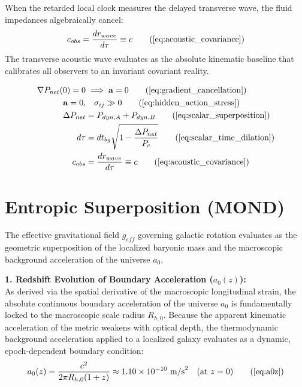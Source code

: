 \documentclass[11pt, a4paper]{article}
\begin{document}
When the retarded local clock measures the delayed transverse wave, the fluid impedances algebraically cancel:
\begin{equation}
    c_{obs} = \frac{dr_{wave}}{d\tau} \equiv c \tag{\ref{eq:acoustic_covariance}}
\end{equation}
The transverse acoustic wave evaluates as the absolute kinematic baseline that calibrates all observers to an invariant covariant reality.

\begin{tcolorbox}[recallbox, title={\ref{box:auxetic_symmetry_covariance}. Symmetry Breaking \& Covariance}]
\begin{align}
    \nabla P_{net}(0) = 0 &\implies \mathbf{a} = 0 \tag{\ref{eq:gradient_cancellation}} \\
    \mathbf{a} = 0, &\quad \sigma_{ij} \gg 0 \tag{\ref{eq:hidden_action_stress}} \\
    \Delta P_{net} &= P_{dyn,A} + P_{dyn,B} \tag{\ref{eq:scalar_superposition}} \\
    d\tau &= dt_{bg} \sqrt{1 - \frac{\Delta P_{net}}{P_c}} \tag{\ref{eq:scalar_time_dilation}} \\
    c_{obs} &= \frac{dr_{wave}}{d\tau} \equiv c \tag{\ref{eq:acoustic_covariance}}
\end{align}
\end{tcolorbox}


\section{Entropic Superposition (MOND)}
\label{sec:deriv_mond}

The effective gravitational field $g_{eff}$ governing galactic rotation evaluates as the geometric superposition of the localized baryonic mass and the macroscopic background acceleration of the universe $a_0$. 

\textbf{1. Redshift Evolution of Boundary Acceleration ($a_0(z)$):} \\
As derived via the spatial derivative of the macroscopic longitudinal strain, the absolute continuous boundary acceleration of the universe $a_0$ is fundamentally locked to the macroscopic scale radius $R_{h,0}$. Because the apparent kinematic acceleration of the metric weakens with optical depth, the thermodynamic background acceleration applied to a localized galaxy evaluates as a dynamic, epoch-dependent boundary condition:
\begin{equation}
    a_0(z) = \frac{c^2}{2\pi R_{h,0}(1+z)} \approx 1.10 \times 10^{-10} \text{ m/s}^2 \quad \text{(at } z=0\text{)} \tag{\ref{eq:a0z}} 
\end{equation}
\end{document}
